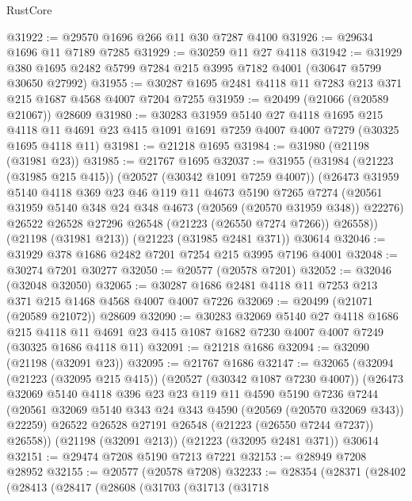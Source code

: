 \begin{lexlean}{RustCore}
\begin{coremodule}
@31922 := @29570 @1696 @266 @11 @30 @7287 @4100
@31926 := @29634 @1696 @11 @7189 @7285
@31929 := @30259 @11 @27 @4118
@31942 := @31929 @380 @1695 @2482 @5799 @7284 @215 @3995 @7182 @4001 (@30647 @5799 @30650 @27992)
@31955 := @30287 @1695 @2481 @4118 @11 @7283 @213 @371 @215 @1687 @4568 @4007 @7204 @7255
@31959 := @20499 (@21066 (@20589 @21067)) @28609
@31980 := @30283
    @31959
    @5140
    @27
    @4118
    @1695
    @215
    @4118
    @11
    @4691
    @23
    @415
    @1091
    @1691
    @7259
    @4007
    @4007
    @7279
    (@30325 @1695 @4118 @11)
@31981 := @21218 @1695
@31984 := @31980 (@21198 (@31981 @23))
@31985 := @21767 @1695
@32037 := @31955
    (@31984
      (@21223 (@31985 @215 @415))
      (@20527 (@30342 @1091 @7259 @4007))
      (@26473
        @31959
        @5140
        @4118
        @369
        @23
        @46
        @119
        @11
        @4673
        @5190
        @7265
        @7274
        (@20561 @31959 @5140 @348 @24 @348 @4673 (@20569 (@20570 @31959 @348)) @22276)
        @26522
        @26528
        @27296
        @26548
        (@21223 (@26550 @7274 @7266))
        @26558))
    (@21198 (@31981 @213))
    (@21223 (@31985 @2481 @371))
    @30614
@32046 := @31929 @378 @1686 @2482 @7201 @7254 @215 @3995 @7196 @4001
@32048 := @30274 @7201 @30277
@32050 := @20577 (@20578 @7201)
@32052 := @32046 (@32048 @32050)
@32065 := @30287 @1686 @2481 @4118 @11 @7253 @213 @371 @215 @1468 @4568 @4007 @4007 @7226
@32069 := @20499 (@21071 (@20589 @21072)) @28609
@32090 := @30283
    @32069
    @5140
    @27
    @4118
    @1686
    @215
    @4118
    @11
    @4691
    @23
    @415
    @1087
    @1682
    @7230
    @4007
    @4007
    @7249
    (@30325 @1686 @4118 @11)
@32091 := @21218 @1686
@32094 := @32090 (@21198 (@32091 @23))
@32095 := @21767 @1686
@32147 := @32065
    (@32094
      (@21223 (@32095 @215 @415))
      (@20527 (@30342 @1087 @7230 @4007))
      (@26473
        @32069
        @5140
        @4118
        @396
        @23
        @23
        @119
        @11
        @4590
        @5190
        @7236
        @7244
        (@20561 @32069 @5140 @343 @24 @343 @4590 (@20569 (@20570 @32069 @343)) @22259)
        @26522
        @26528
        @27191
        @26548
        (@21223 (@26550 @7244 @7237))
        @26558))
    (@21198 (@32091 @213))
    (@21223 (@32095 @2481 @371))
    @30614
@32151 := @29474 @7208 @5190 @7213 @7221
@32153 := @28949 @7208 @28952
@32155 := @20577 (@20578 @7208)
@32233 := @28354
    (@28371
      (@28402
        (@28413
          (@28417
            (@28608
              (@31703
                (@31713
                  (@31718

\end{coremodule}
\end{lexlean}
